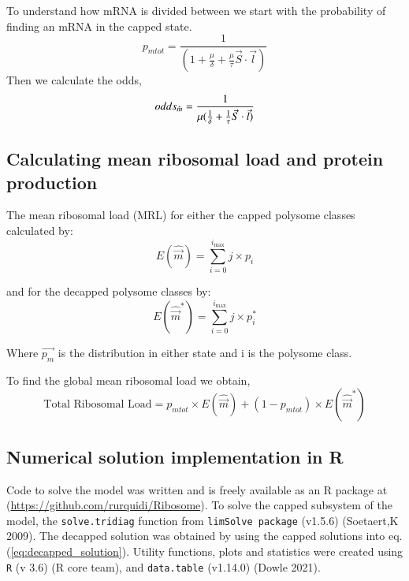 \documentclass[review]{elsarticle}
\newcommand{\imax}{\ensuremath{{i_{\max}}}\xspace}
\newcommand{\mvec}{\ensuremath{\vec{m}}\xspace}
\newcommand{\mvechat}{\ensuremath{\hat{\mvec}}\xspace}
\newcommand{\mvechatstar}{\ensuremath{\mvechat^*}\xspace}
\begin{document}
To understand how mRNA is divided  between we start with the probability of finding an mRNA in the capped state.
\begin{equation*}
	p_{mtot} = \frac{1}{(1  + \frac{\mu}{\delta} + \frac{\mu}{\tau}\vec{S} \cdot \vec{l})}	
\end{equation*}
Then we calculate the odds,
\begin{equation}\label{eq:odds}
	odds_{\hat{m}} = \frac{1}{\mu(\frac{1}{\delta} + \frac{1}{\tau}\vec{S} \cdot \vec{l})} \\
\end{equation}


\subsection{Calculating mean ribosomal load and protein production}
The mean ribosomal load (MRL) for either the capped polysome classes calculated by:
\begin{equation}\label{eq:Expected_ribo_capped}
	E(\mvechat) =\sum_{i=0}^{\imax}j\times p_{i}
\end{equation}

and for the decapped polysome classes by:
\begin{equation}\label{eq:Expected_ribo_decapped}
	E(\mvechatstar) =\sum_{i=0}^{\imax}j\times p_{i}^*
\end{equation}

Where $\vec{p_m}$ is the distribution in either state and i is the polysome class.

To find the global mean ribosomal load we obtain,
\begin{equation}\label{eq:System_ribo_load}
	\text{Total Ribosomal Load} = p_{mtot}\times E(\mvechat) + (1-p_{mtot})\times E(\mvechatstar)
\end{equation}

\subsection{Numerical solution implementation in R}
Code to solve the model was written and is freely available as an R package at (\url{https://github.com/rurquidi/Ribosome}). To solve the capped subsystem of the model, the \texttt{solve.tridiag} function from \texttt{limSolve package} (v1.5.6) (Soetaert,K 2009). The decapped solution was obtained by using the capped solutions into eq. (\ref{eq:decapped_solution}). Utility functions, plots and statistics were created using  \texttt{R} (v 3.6) (R core team), and  \texttt{data.table} (v1.14.0) (Dowle 2021). 
		
\end{document}
